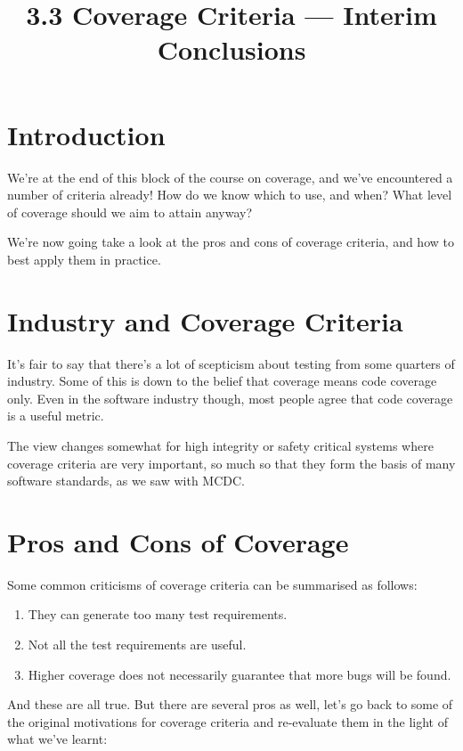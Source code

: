 



\title{3.3 Coverage Criteria --- Interim Conclusions}

\section{Introduction}

We're at the end of this block of the course on coverage, and we've encountered
a number of criteria already! How do we know which to use, and when? What level
of coverage should we aim to attain anyway? 

We're now going take a look at the pros and cons of coverage criteria, and how
to best apply them in practice.

\section{Industry and Coverage Criteria}

It's fair to say that there's a lot of scepticism about testing from some
quarters of industry. Some of this is down to the belief that coverage means
code coverage only. Even in the software industry though, most people agree that
code coverage is a useful metric.

The view changes somewhat for high integrity or safety critical systems where
coverage criteria are very important, so much so that they form the basis of
many software standards, as we saw with MCDC.

\section{Pros and Cons of Coverage}

Some common criticisms of coverage criteria can be summarised as follows:

\begin{enumerate}
    \item They can generate too many test requirements.
    \item Not all the test requirements are useful.
    \item Higher coverage does not necessarily guarantee that more bugs will be
    found.
\end{enumerate}

And these are all true. But there are several pros as well, let's go back to
some of the original motivations for coverage criteria and re-evaluate them in
the light of what we've learnt:

